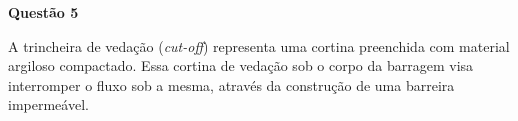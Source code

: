 \item[]\textbf{Questão 5}

\hspace{1cm} A trincheira de vedação (\textit{cut-off}) representa uma cortina preenchida com material argiloso compactado. Essa cortina de vedação sob o corpo da barragem visa interromper o fluxo sob a mesma, através da construção de uma barreira impermeável. 